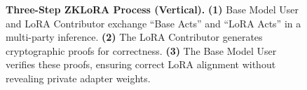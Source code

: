 \documentclass[11pt]{article}
\begin{document}
\begin{figure}[ht]
\caption{\textbf{Three-Step ZKLoRA Process (Vertical).}
\textbf{(1)} Base Model User and LoRA Contributor exchange “Base Acts” and “LoRA Acts” in a multi-party inference.
\textbf{(2)} The LoRA Contributor generates cryptographic proofs for correctness.
\textbf{(3)} The Base Model User verifies these proofs, ensuring correct LoRA alignment without revealing private adapter weights.}
\label{fig:zklora_3steps}
\end{figure}
\end{document}
